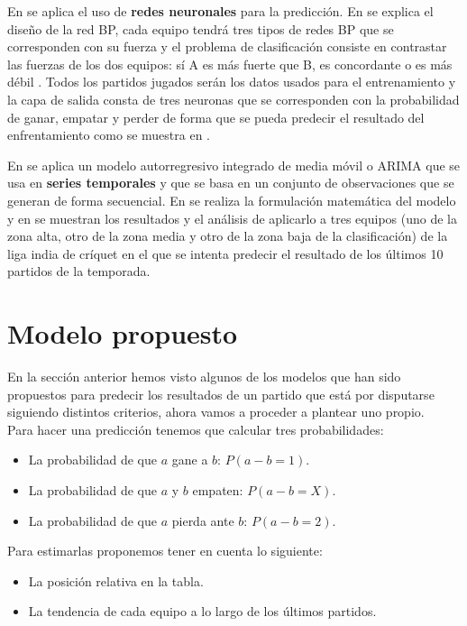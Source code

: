 En \cite{refpred2} se aplica el uso de \textbf{redes neuronales} para la predicción. En \cite[Section 2.1.]{refpred2} se explica el diseño de la red BP, cada equipo tendrá tres tipos de redes BP que se corresponden con su fuerza y el problema de clasificación consiste en contrastar las fuerzas de los dos equipos: sí A es más fuerte que B, es concordante o es más débil \cite[Section 2.2.]{refpred2}. Todos los partidos jugados serán los datos usados para el entrenamiento \cite[Section 3.1.]{refpred2} y la capa de salida consta de tres neuronas que se corresponden con la probabilidad de ganar, empatar y perder \cite[Section 3.2.]{refpred2} de forma que se pueda predecir el resultado del enfrentamiento como se muestra en \cite[Section 3.4.]{refpred2}.

En \cite{refpred3} se aplica un modelo autorregresivo integrado de media móvil o ARIMA que se usa en \textbf{series temporales} y que se basa en un conjunto de observaciones que se generan de forma secuencial. En \cite[Section E]{refpred3} se realiza la formulación matemática del modelo y en \cite[Section F]{refpred3} se muestran los resultados y el análisis de aplicarlo a tres equipos (uno de la zona alta, otro de la zona media y otro de la zona baja de la clasificación) de la liga india de críquet en el que se intenta predecir el resultado de los últimos 10 partidos de la temporada.\\

\section{Modelo propuesto}
En la sección anterior hemos visto algunos de los modelos que han sido propuestos para predecir los resultados de un partido que está por disputarse siguiendo distintos criterios, ahora vamos a proceder a plantear uno propio. \\

Para hacer una predicción tenemos que calcular tres probabilidades:
\begin{itemize}
	\item La probabilidad de que $a$ gane a $b$: $P(a-b=1)$.
	\item La probabilidad de que $a$ y $b$ empaten: $P(a-b=X)$.
	\item La probabilidad de que $a$ pierda ante $b$: $P(a-b=2)$.
\end{itemize}
Para estimarlas proponemos tener en cuenta lo siguiente:
\begin{itemize}
	\item La posición relativa en la tabla.
	\item La tendencia de cada equipo a lo largo de los últimos partidos.
\end{itemize}

